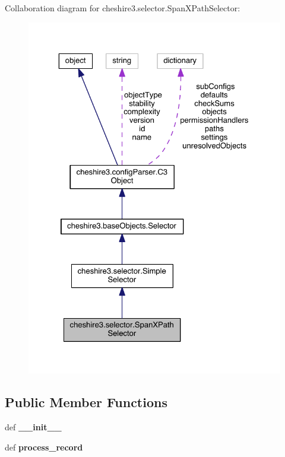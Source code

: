 Collaboration diagram for cheshire3.\-selector.\-Span\-X\-Path\-Selector\-:
\nopagebreak
\begin{figure}[H]
\begin{center}
\leavevmode
\includegraphics[width=325pt]{classcheshire3_1_1selector_1_1_span_x_path_selector__coll__graph}
\end{center}
\end{figure}
\subsection*{Public Member Functions}
\begin{DoxyCompactItemize}
\item 
\hypertarget{classcheshire3_1_1selector_1_1_span_x_path_selector_abc9f769ce6449e9fd90636eb34f318c6}{def {\bfseries \-\_\-\-\_\-init\-\_\-\-\_\-}}\label{classcheshire3_1_1selector_1_1_span_x_path_selector_abc9f769ce6449e9fd90636eb34f318c6}

\item 
\hypertarget{classcheshire3_1_1selector_1_1_span_x_path_selector_aa4716f17facc7c1a17f6e56b52366a14}{def {\bfseries process\-\_\-record}}\label{classcheshire3_1_1selector_1_1_span_x_path_selector_aa4716f17facc7c1a17f6e56b52366a14}

\end{DoxyCompactItemize}
